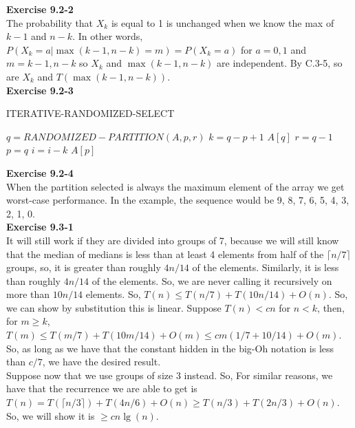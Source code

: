 \documentclass{article}
\begin{document}
\noindent\textbf{Exercise 9.2-2}\\

The probability that $X_k$ is equal to 1 is unchanged when we know the max of $k-1$ and $n-k$.  In other words, $P(X_k = a | \max(k-1, n-k) = m) = P(X_k = a)$ for $a=0,1$ and $m=k-1, n-k$ so $X_k$ and $\max(k-1, n-k)$ are independent. By C.3-5, so are $X_k$ and $T(\max(k-1, n-k))$. \\

\noindent\textbf{ Exercise 9.2-3} \\
\begin{algorithm}
\caption{ ITERATIVE-RANDOMIZED-SELECT}
\begin{algorithmic}
\State $q = RANDOMIZED-PARTITION(A,p,r)$
\State $k=q-p+1$
\State \Return $A[q]$
\EndIf
{}
\State $r = q-1$
\Else
\State $p=q$
\State $i=i-k$
\EndIf
\EndWhile
\State \Return $A[p]$

\end{algorithmic}
\end{algorithm}

\noindent\textbf{Exercise 9.2-4}\\

When the partition selected is always the maximum element of the array we get worst-case performance.  In the example, the sequence would be 9, 8, 7, 6, 5, 4, 3, 2, 1, 0. \\

\noindent\textbf{ Exercise 9.3-1} \\
It will still work if they are divided into groups of 7, because we will still know that the median of medians is less than at least 4 elements from half of the $\lceil n/7 \rceil$ groups, so, it is greater than roughly $4n/14$ of the elements. Similarly, it is less than roughly $4n/14$ of the elements. So, we are never calling it recursively on more than $10n/14$ elements. So, $T(n) \le T(n/7) + T(10n/14)+O(n)$. So, we can show by substitution this is linear. Suppose $T(n) < cn$ for $n<k$, then, for $m\ge k$, $T(m) \le T(m/7) + T(10m/14) + O(m) \le cm(1/7+10/14) + O(m)$. So, as long as we have that the constant hidden in the big-Oh notation is less than $c/7$, we have the desired result.\\

Suppose now that we use groups of size $3$ instead. So, For similar reasons, we have that the recurrence we are able to get is $T(n) = T(\lceil n/3 \rceil) + T(4n/6) + O(n) \ge T(n/3)+ T(2n/3) +O(n)$. So, we will show it is $\ge cn\lg(n)$.
\end{document}
